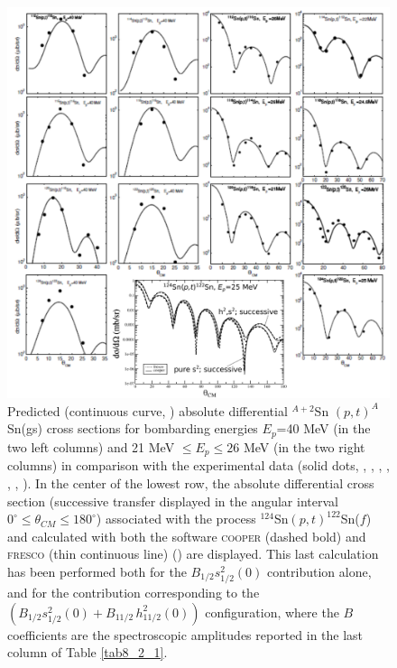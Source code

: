   \begin{figure}
  \centerline{\includegraphics*[width=15cm,angle=0]{C8/figsC8/fig8_2_4}}
  	\caption{Predicted (continuous curve, \cite{Potel:13,Potel:13b}) absolute differential $^{A+2}$Sn $(p,t)^A$Sn(gs) cross sections for bombarding
  	energies $E_p$=40 MeV (in the two left columns) and 21 MeV $\leq E_p \leq 26$ MeV (in the two right columns) in comparison with the
  	experimental data (solid dots, \cite{Bassani:65}, \cite{Guazzoni:99}, \cite{Guazzoni:04}, \cite{Guazzoni:06}, \cite{Guazzoni:08}, \cite{Guazzoni:11}, \cite{Guazzoni:12}). In the center of the lowest row, the absolute differential cross section (successive transfer displayed in the angular interval $0^\circ\leq\theta_{CM}\leq180^\circ$) associated with the process $^{124}$Sn$(p,t)^{122}$Sn($f$)  and calculated with both the software \textsc{cooper} (dashed bold) and  \textsc{fresco} (thin continuous line) (\cite{Thompson:88}) are displayed. This last calculation has been performed both for the $B_{1/2}s_{1/2}^2(0)$ contribution alone, and for the contribution corresponding to the $(B_{1/2}s_{1/2}^2(0)+B_{11/2}\,h_{11/2}^2(0))$ configuration, where the $B$ coefficients are the spectroscopic amplitudes reported in the last column of Table \ref{tab8_2_1}. }\label{fig8_2_4}
  \end{figure}
  



